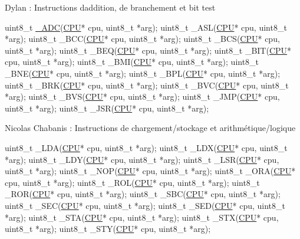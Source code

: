 \begin{DoxyItemize}
\item Dylan \+: Instructions d\textquotesingle{}addition, de branchement et bit test
\end{DoxyItemize}


\begin{DoxyCode}
uint8\_t \hyperlink{instruction_8h_a03b707d9b2d4827eacc7dc37f9909081}{\_ADC}(\hyperlink{struct_c_p_u}{CPU}* cpu, uint8\_t *arg);
uint8\_t \_ASL(\hyperlink{struct_c_p_u}{CPU}* cpu, uint8\_t *arg);
uint8\_t \_BCC(\hyperlink{struct_c_p_u}{CPU}* cpu, uint8\_t *arg);
uint8\_t \_BCS(\hyperlink{struct_c_p_u}{CPU}* cpu, uint8\_t *arg);
uint8\_t \_BEQ(\hyperlink{struct_c_p_u}{CPU}* cpu, uint8\_t *arg);
uint8\_t \_BIT(\hyperlink{struct_c_p_u}{CPU}* cpu, uint8\_t *arg);
uint8\_t \_BMI(\hyperlink{struct_c_p_u}{CPU}* cpu, uint8\_t *arg);
uint8\_t \_BNE(\hyperlink{struct_c_p_u}{CPU}* cpu, uint8\_t *arg);
uint8\_t \_BPL(\hyperlink{struct_c_p_u}{CPU}* cpu, uint8\_t *arg);
uint8\_t \_BRK(\hyperlink{struct_c_p_u}{CPU}* cpu, uint8\_t *arg);
uint8\_t \_BVC(\hyperlink{struct_c_p_u}{CPU}* cpu, uint8\_t *arg);
uint8\_t \_BVS(\hyperlink{struct_c_p_u}{CPU}* cpu, uint8\_t *arg);
uint8\_t \_JMP(\hyperlink{struct_c_p_u}{CPU}* cpu, uint8\_t *arg);
uint8\_t \_JSR(\hyperlink{struct_c_p_u}{CPU}* cpu, uint8\_t *arg);
\end{DoxyCode}

\begin{DoxyItemize}
\item Nicolas Chabanis \+: Instructions de chargement/stockage et arithmétique/logique
\end{DoxyItemize}


\begin{DoxyCode}
uint8\_t \_LDA(\hyperlink{struct_c_p_u}{CPU}* cpu, uint8\_t *arg);
uint8\_t \_LDX(\hyperlink{struct_c_p_u}{CPU}* cpu, uint8\_t *arg);
uint8\_t \_LDY(\hyperlink{struct_c_p_u}{CPU}* cpu, uint8\_t *arg);
uint8\_t \_LSR(\hyperlink{struct_c_p_u}{CPU}* cpu, uint8\_t *arg);
uint8\_t \_NOP(\hyperlink{struct_c_p_u}{CPU}* cpu, uint8\_t *arg);
uint8\_t \_ORA(\hyperlink{struct_c_p_u}{CPU}* cpu, uint8\_t *arg);
uint8\_t \_ROL(\hyperlink{struct_c_p_u}{CPU}* cpu, uint8\_t *arg);
uint8\_t \_ROR(\hyperlink{struct_c_p_u}{CPU}* cpu, uint8\_t *arg);
uint8\_t \_SBC(\hyperlink{struct_c_p_u}{CPU}* cpu, uint8\_t *arg);
uint8\_t \_SEC(\hyperlink{struct_c_p_u}{CPU}* cpu, uint8\_t *arg);
uint8\_t \_SED(\hyperlink{struct_c_p_u}{CPU}* cpu, uint8\_t *arg);
uint8\_t \_STA(\hyperlink{struct_c_p_u}{CPU}* cpu, uint8\_t *arg);
uint8\_t \_STX(\hyperlink{struct_c_p_u}{CPU}* cpu, uint8\_t *arg);
uint8\_t \_STY(\hyperlink{struct_c_p_u}{CPU}* cpu, uint8\_t *arg);
\end{DoxyCode}
 